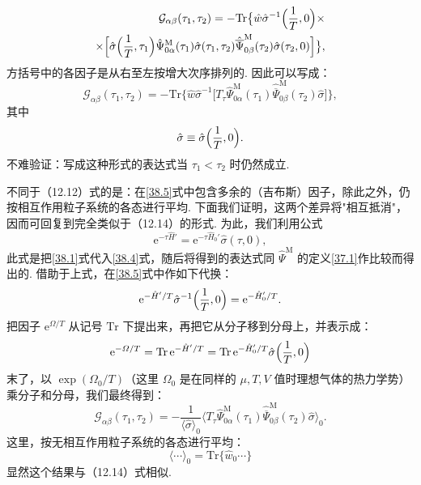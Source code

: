 \begin{equation*}
\begin{aligned}
\mathcal G_{\alpha\beta}(\tau_1,\tau_2)=-\mathrm{Tr}\bigl\{\hat w\hat\sigma^{-1}\Bigl(\frac{1}{T},0\Bigr)\times\\
\times\Bigl[\hat\sigma\Bigl(\frac{1}{T},\tau_1\Bigr)\hat\Psi^{\mathrm M}_{0\alpha}(\tau_1)\hat\sigma(\tau_1,\tau_2)\hat{\overline\Psi}^{\mathrm M}_{0\beta}(\tau_2)\hat\sigma(\tau_2,0)\Bigr]\bigr\},
\end{aligned}
\end{equation*}
方括号中的各因子是从右至左按增大次序排列的. 因此可以写成：
\begin{equation}
\mathcal G_{\alpha\beta}(\tau_1,\tau_2)=-\mathrm{Tr}\bigl\{\hat w\hat\sigma^{-1}
\bigl[T_\tau\hat\Psi^{\mathrm M}_{0\alpha}(\tau_1)\hat{\overline\Psi}^{\mathrm M}_{0\beta}(\tau_2)\hat\sigma\bigr]\bigr\},
\label{38.5}
\end{equation}
其中
\begin{equation*}
\hat\sigma\equiv\hat\sigma\Bigl(\frac{1}{T},0\Bigr).
\end{equation*}
不难验证：写成这种形式的表达式当 $\tau_1<\tau_2$ 时仍然成立.

不同于（12.12）式的是：在\eqref{38.5}式中包含多余的（吉布斯）因子，除此之外，仍按相互作用粒子系统的各态进行平均. 下面我们证明，这两个差异将"相互抵消"，因而可回复到完全类似于（12.14）的形式. 为此，我们利用公式
\begin{equation}
\mathrm{e}^{-\tau\hat H'}=\mathrm{e}^{-\tau\hat H_0'}\hat\sigma(\tau,0),
\label{38.6}
\end{equation}
此式是把\eqref{38.1}式代入\eqref{38.4}式，随后将得到的表达式同 $\hat\Psi^{\mathrm M}$ 的定义\eqref{37.1}作比较而得出的. 借助于上式，在\eqref{38.5}式中作如下代换：
\begin{equation*}
\mathrm{e}^{-\hat H'/T}\hat\sigma^{-1}\Bigl(\frac{1}{T},0\Bigr)=\mathrm{e}^{-\hat H_0'/T}.
\end{equation*}
把因子 $\mathrm{e}^{\varOmega/T}$ 从记号 $\mathrm{Tr}$ 下提出来，再把它从分子移到分母上，并表示成：
\begin{equation*}
\mathrm{e}^{-\varOmega/T}=\mathrm{Tr}\,\mathrm{e}^{-\hat H'/T}
=\mathrm{Tr}\,\mathrm{e}^{-\hat H_0'/T}\hat\sigma\Bigl(\frac{1}{T},0\Bigr)
\end{equation*}
末了，以 $\exp(\Omega_0/T)$（这里 $\Omega_0$ 是在同样的 $\mu,T,V$ 值时理想气体的热力学势）乘分子和分母，我们最终得到：
\begin{equation}
\mathcal G_{\alpha\beta}(\tau_1,\tau_2)=-\frac{1}{\langle\hat\sigma\rangle_0}
\bigl\langle T_\tau\hat\Psi^{\mathrm M}_{0\alpha}(\tau_1)\hat{\overline\Psi}^{\mathrm M}_{0\beta}(\tau_2)\hat\sigma\bigr\rangle_0.
\label{38.7}
\end{equation}
这里，按无相互作用粒子系统的各态进行平均：
\begin{equation*}
\langle\cdots\rangle_0=\mathrm{Tr}\{\hat w_0\cdots\}
\end{equation*}
显然这个结果与（12.14）式相似.

